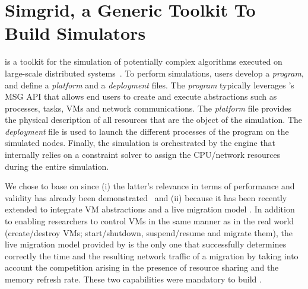\section{Simgrid, a Generic Toolkit To Build Simulators}
\label{sec:sg}


\sg is a toolkit for the simulation of potentially complex algorithms
executed on large-scale distributed
systems~\cite{casanova:hal-01017319}.
%
To perform simulations, users develop a \emph{program}, and define a
\emph{platform} and a \emph{deployment} files. The \emph{program}
typically leverages \sg's MSG API that allows end users to create
and execute \sg abstractions such as processes, tasks, VMs and network
communications. The \emph{platform} file provides the physical
description of all resources that are the object of the simulation.
The \emph{deployment} file is used to launch the different \sg
processes of the program on the simulated nodes.
Finally, the simulation is orchestrated by the \sg engine that
internally relies on a constraint solver to assign the CPU/network
resources during the entire
simulation.%


We chose to base \vmps on \sg
since (i) the latter's relevance in terms of performance and validity
has already been demonstrated~\cite{simgridpub} and (ii) because it
has been recently extended to integrate VM abstractions and a live
migration model \cite{Hirofuchi:2013:ALM:2568486.2568524}. In addition
to enabling researchers to control VMs in the same manner as in the
real world (\eg create/destroy VMs; start/shutdown, suspend/resume and
migrate them),
the live migration model provided by \sg  is the only one that successfully determines
correctly the time and the resulting network traffic of a migration by taking into
account the competition arising in the presence of resource sharing
and the memory refresh rate.
%
These two capabilities were
mandatory to build \vmps.%



